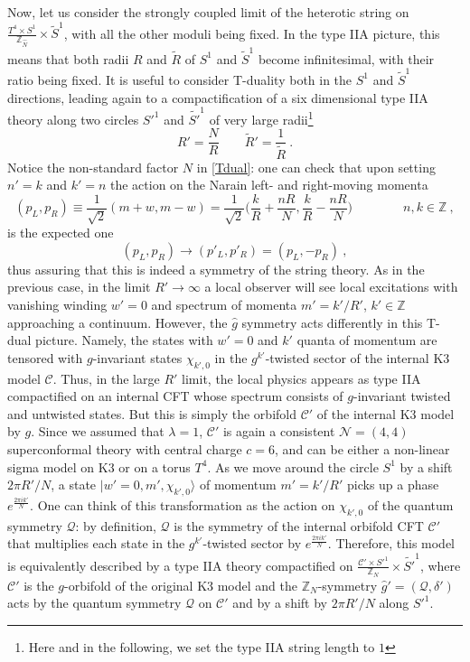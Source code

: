 \documentclass[a4paper,11pt]{article}
\newcommand{\ZZ}{\mathbb{Z}}
\newcommand{\C}{\mathcal{C}}
\newcommand{\N}{\mathcal{N}}
\newcommand{\Q}{\mathcal{Q}}
\numberwithin{equation}{section}
\def\be{\begin{equation}}
\def\ee{\end{equation}}
\begin{document}
\bigskip

Now, let us consider the strongly coupled limit of the heterotic string on $\frac{T^4\times S^1}{\ZZ_{\hat N}}\times \tilde S^1$, with all the other moduli being fixed. In the type IIA picture, this means that both radii $R$ and $\tilde R$ of $S^1$ and $\tilde S^1$ become infinitesimal, with their ratio being fixed.  It is useful to consider T-duality both in the $S^1$ and $\tilde S^1$ directions, leading again to a compactification of a six dimensional type IIA theory along two circles $ {S'}^1$ and $\tilde {S'}^1$ of very large radii\footnote{Here and in the following, we set the type IIA string length to $1$}
\be\label{Tdual} R'=\frac{N}{R}\qquad \tilde R'=\frac{1}{\tilde R}\ .
\ee Notice the non-standard factor $N$ in \eqref{Tdual}: one can check that upon setting $n'=k$ and $k'=n$ the action on the Narain left- and right-moving momenta
\be (p_L,p_R)\equiv \frac{1}{\sqrt2} (m+w,m-w)=\frac{1}{\sqrt2}\bigl(\frac{k}{R}+\frac{nR}{N},\frac{k}{R}-\frac{nR}{N}\bigr) \qquad\qquad n,k\in\ZZ\ , \ee 
is the expected one
\be (p_L,p_R)\to (p'_L,p'_R)=(p_L,-p_R)\ ,
\ee
thus assuring that this is indeed a symmetry of the string theory. As in the previous case, in the limit $R'\to \infty$ a local observer will see local excitations with vanishing winding $w'=0$ and spectrum of momenta $m'=k'/{R'}$, $k'\in \ZZ$ approaching a continuum. However, the $\hat g$ symmetry acts differently in this T-dual picture. Namely, the states with $w'=0$ and $k'$ quanta of momentum are tensored with $g$-invariant states $\chi_{k',0}$ in the $g^{k'}$-twisted sector of the internal K3 model $\C$. Thus, in the large $R'$ limit, the local physics appears as type IIA compactified on an internal CFT whose spectrum consists of $g$-invariant twisted and untwisted states. But this is simply the orbifold $\C'$ of the internal K3 model by $g$. Since we assumed that $\lambda=1$, $\C'$ is again a consistent $\N=(4,4)$ superconformal theory with central charge $c=6$, and can be either a non-linear sigma model on K3 or on a torus $T^4$. As we move around the circle $S^1$ by a shift $2\pi R'/N$, a state $|w'=0,m',\chi_{k',0}\rangle$ of momentum $m'=k'/{R'}$ picks up a phase $e^{\frac{2\pi ik'}{N}}$. One can think of this transformation as the action on $\chi_{k',0}$ of the quantum symmetry $\Q$: by definition, $\Q$ is the symmetry of the internal orbifold CFT $\C'$ that multiplies each state in the $g^{k'}$-twisted sector by $e^{\frac{2\pi ik'}{N}}$. Therefore, this model is equivalently described by a type IIA theory compactified on $\frac{\C'\times {S'}^1}{\ZZ_{N}}\times \tilde {S'}^1$, where $\C'$ is the $g$-orbifold of the original K3 model and the $\ZZ_{N}$-symmetry $\hat{g}'=(\Q,\delta')$ acts by the quantum symmetry $\Q$ on $\C'$ and by a shift by $2\pi R'/N$ along ${S'}^1$. 
\end{document}

